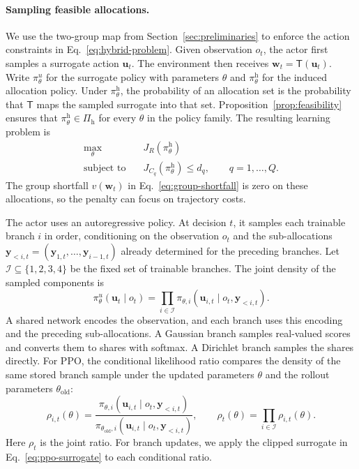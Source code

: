 \documentclass[10pt]{article}
\begin{document}
\paragraph{Sampling feasible allocations.}
We use the two-group map from Section~\ref{sec:preliminaries} to enforce the action constraints in Eq.~\eqref{eq:hybrid-problem}. Given observation $o_t$, the actor first samples a surrogate action $\bm u_t$. The environment then receives $\bm w_t=\mathsf T(\bm u_t)$. Write $\pi_\theta^u$ for the surrogate policy with parameters $\theta$ and $\pi_\theta^{\mathrm h}$ for the induced allocation policy. Under $\pi_\theta^{\mathrm h}$, the probability of an allocation set is the probability that $\mathsf T$ maps the sampled surrogate into that set. Proposition~\ref{prop:feasibility} ensures that $\pi_\theta^{\mathrm h}\in\Pi_{\mathrm h}$ for every $\theta$ in the policy family. The resulting learning problem is
\begin{equation}
  \begin{aligned}
    \max_\theta \quad &J_R(\pi_\theta^{\mathrm h})\\
    \text{subject to}\quad
      &J_{C_q}(\pi_\theta^{\mathrm h})\le d_q,\qquad q=1,\ldots,Q.
  \end{aligned}
  \label{eq:restricted-problem}
\end{equation}
The group shortfall $v(\bm w_t)$ in Eq.~\eqref{eq:group-shortfall} is zero on these allocations, so the penalty can focus on trajectory costs.

The actor uses an autoregressive policy. At decision $t$, it samples each trainable branch $i$ in order, conditioning on the observation $o_t$ and the sub-allocations $\bm y_{<i,t}=(\bm y_{1,t},\ldots,\bm y_{i-1,t})$ already determined for the preceding branches. Let $\mathcal I\subseteq\{1,2,3,4\}$ be the fixed set of trainable branches. The joint density of the sampled components is
\begin{equation}
  \pi_\theta^u(\bm u_t\mid o_t)
    =\prod_{i\in\mathcal I}
       \pi_{\theta,i}(\bm u_{i,t}\mid o_t,\bm y_{<i,t}).
  \label{eq:autoregressive-policy}
\end{equation}
A shared network encodes the observation, and each branch uses this encoding and the preceding sub-allocations. A Gaussian branch samples real-valued scores and converts them to shares with softmax. A Dirichlet branch samples the shares directly. For PPO, the conditional likelihood ratio compares the density of the same stored branch sample under the updated parameters $\theta$ and the rollout parameters $\theta_{\mathrm{old}}$:
\begin{equation}
  \rho_{i,t}(\theta)=
    \frac{\pi_{\theta,i}(\bm u_{i,t}\mid o_t,\bm y_{<i,t})}
         {\pi_{\theta_{\mathrm{old}},i}(\bm u_{i,t}\mid o_t,\bm y_{<i,t})},
  \qquad
  \rho_t(\theta)=\prod_{i\in\mathcal I}\rho_{i,t}(\theta).
  \label{eq:ppo-ratios}
\end{equation}
Here $\rho_t$ is the joint ratio. For branch updates, we apply the clipped surrogate in Eq.~\eqref{eq:ppo-surrogate} to each conditional ratio.
\end{document}

